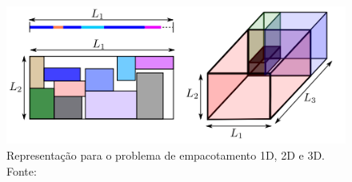 \begin{figure}[!htb]
    \centering
    \includegraphics[scale=1]{utils/images/packing-example}
    \caption{Representação para o problema de empacotamento 1D, 2D e 3D. \\ Fonte:\cite{castellucci2019consolidation}}
    \label{fig:packing-example}
\end{figure}
